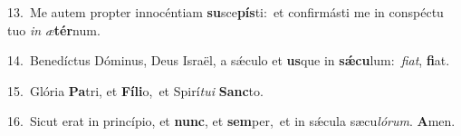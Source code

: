 {\numbfont\textcolor{\numbcolor}{13.}}~Me autem propter innocéntiam \textbf{su}\-sce\-\textbf{pís}\-ti:~\star et confirmásti me in conspéctu tuo \textit{in} \textit{æ}\-\textbf{tér}num.\par
{\numbfont\textcolor{\numbcolor}{14.}}~Benedíctus Dóminus, Deus Israël, a sǽculo et \textbf{us}\-que in \textbf{sǽ}\-\textbf{cu}lum:~\star \textit{fi}\-\textit{at}, \textbf{fi}\-at.\par
{\numbfont\textcolor{\numbcolor}{15.}}~Glória \textbf{Pa}\-tri, et \textbf{Fí}\-\textbf{li}o,~\star et Spirí\-\textit{tu}\-\textit{i} \textbf{Sanc}\-to.\par
{\numbfont\textcolor{\numbcolor}{16.}}~Sicut erat in princípio, et \textbf{nunc}\-, et \textbf{sem}\-per,~\star et in sǽcula sæcu\-\textit{ló}\-\textit{rum}. \textbf{A}\-men.\par
